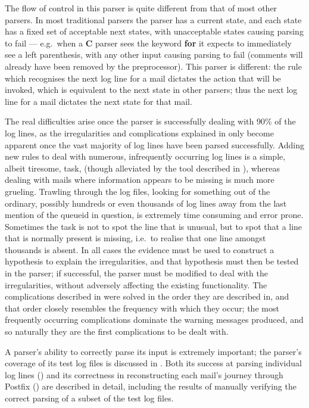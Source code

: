 The flow of control in this parser is quite different from that of most
other parsers.  In most traditional parsers the parser has a current state,
and each state has a fixed set of acceptable next states, with unacceptable
states causing parsing to fail --- e.g.\ when a \textbf{C} parser sees the
keyword \textbf{for} it expects to immediately see a left parenthesis, with
any other input causing parsing to fail (comments will already have been
removed by the preprocessor).  This parser is different: the rule which
recognises the next log line for a mail dictates the action that will be
invoked, which is equivalent to the next state in other parsers; thus the
next log line for a mail dictates the next state for that mail.

The real difficulties arise once the parser is successfully dealing with
90\% of the log lines, as the irregularities and complications explained in
 only become apparent once the vast majority of
log lines have been parsed successfully.  Adding new rules to deal with
numerous, infrequently occurring log lines is a simple, albeit tiresome,
task, (though alleviated by the tool described in ), whereas dealing with mails where information
appears to be missing is much more grueling.  Trawling through the log
files, looking for something out of the ordinary, possibly hundreds or even
thousands of log lines away from the last mention of the queueid in
question, is extremely time consuming and error prone.  Sometimes the task
is not to spot the line that is unusual, but to spot that a line that is
normally present is missing, i.e.\ to realise that one line amongst
thousands is absent.  In all cases the evidence must be used to construct a
hypothesis to explain the irregularities, and that hypothesis must then be
tested in the parser; if successful, the parser must be modified to deal
with the irregularities, without adversely affecting the existing
functionality.  The complications described in 
were solved in the order they are described in, and that order closely
resembles the frequency with which they occur; the most frequently
occurring complications dominate the warning messages produced, and so
naturally they are the first complications to be dealt with.

A parser's ability to correctly parse its input is extremely important; the
parser's coverage of its test log files is discussed in .  Both its success at parsing individual log lines
() and its correctness in reconstructing each
mail's journey through Postfix () are described
in detail, including the results of manually verifying the correct parsing
of a subset of the test log files.

\newpage


